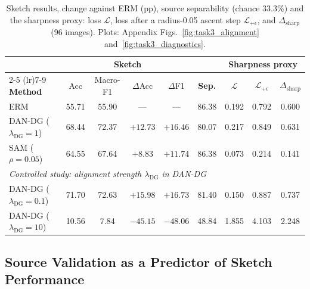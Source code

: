 \begin{table}[htbp]
  \caption{Sketch results, change against ERM (pp), source separability (chance 33.3\%) and the sharpness proxy: loss $\mathcal L$, loss after a radius-0.05 ascent step $\mathcal L_{+\epsilon}$, and $\Delta_{\mathrm{sharp}}$ (96 images). Plots: Appendix Figs.~\ref{fig:task3_alignment} and~\ref{fig:task3_diagnostics}.}
  \label{tab:task3_target}
  \centering
  \small
  \setlength{\tabcolsep}{4pt}
  \begin{tabular}{lcccccccc}
    \toprule
    & \multicolumn{4}{c}{\textbf{Sketch}} & & \multicolumn{3}{c}{\textbf{Sharpness proxy}} \\
    \cmidrule(lr){2-5} \cmidrule(lr){7-9}
    \textbf{Method} & Acc & Macro-F1 & $\Delta$Acc & $\Delta$F1 & \textbf{Sep.} & $\mathcal L$ & $\mathcal L_{+\epsilon}$ & $\Delta_{\mathrm{sharp}}$ \\
    \midrule
    ERM                                & 55.71 & 55.90 & ---       & ---       & 86.38 & 0.192 & 0.792 & 0.600 \\
    DAN-DG ($\lambda_{\mathrm{DG}}=1$) & 68.44 & 72.37 & $+12.73$  & $+16.46$  & 80.07 & 0.217 & 0.849 & 0.631 \\
    SAM ($\rho=0.05$)                  & 64.55 & 67.64 & $+8.83$   & $+11.74$  & 86.38 & 0.073 & 0.214 & 0.141 \\
    \midrule
    \multicolumn{9}{l}{\textit{Controlled study: alignment strength $\lambda_{\mathrm{DG}}$ in DAN-DG}} \\
    DAN-DG ($\lambda_{\mathrm{DG}}=0.1$) & 71.70 & 72.63 & $+15.98$ & $+16.73$ & 81.40 & 0.150 & 0.887 & 0.737 \\
    DAN-DG ($\lambda_{\mathrm{DG}}=10$)  & 10.56 & 7.84  & $-45.15$ & $-48.06$ & 48.84 & 1.855 & 4.103 & 2.248 \\
    \bottomrule
  \end{tabular}
\end{table}

\subsection{Source Validation as a Predictor of Sketch Performance}



